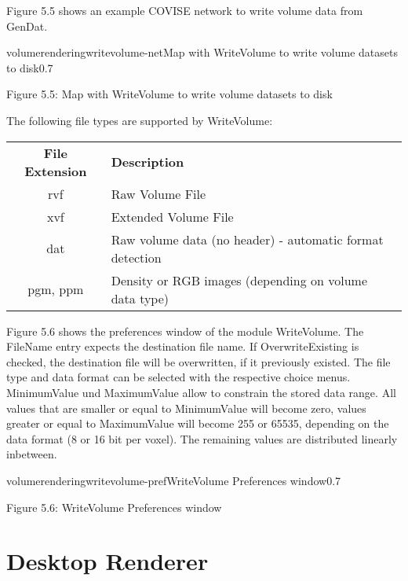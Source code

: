 Figure 5.5 shows an example COVISE network to write volume data from GenDat. 

\begin{covimg}{volumerendering}{writevolume-net}{Map with WriteVolume to write volume datasets to disk}{0.7}\end{covimg}
\begin{htmlonly}
Figure 5.5: Map with WriteVolume to write volume datasets to disk
\vspace{0.5cm}
\end{htmlonly}

The following file types are supported by WriteVolume:

\begin{table}
\begin{tabular}{|c|l|}
\hline {\bf File Extension} & {\bf Description} \\
rvf & Raw Volume File \\ %
xvf & Extended Volume File \\ %
dat & Raw volume data (no header) - automatic format detection \\ %
pgm, ppm & Density or RGB images (depending on volume data type) \\ 
\hline
\end{tabular}
\end{table}

Figure 5.6 shows the preferences window of the module WriteVolume. The FileName entry expects the destination file name.
If OverwriteExisting is checked, the destination file will be overwritten, if it previously existed.
The file type and data format can be selected with the respective choice menus.
MinimumValue und MaximumValue allow to constrain the stored data range. All values that are smaller
or equal to MinimumValue will become zero, values greater or equal to MaximumValue will become
255 or 65535, depending on the data format (8 or 16 bit per voxel). The remaining values are 
distributed linearly inbetween.

\begin{covimg}{volumerendering}{writevolume-pref}{WriteVolume Preferences window}{0.7}\end{covimg}
\begin{htmlonly}
Figure 5.6: WriteVolume Preferences window
\vspace{0.5cm}
\end{htmlonly}


\section{Desktop Renderer}

